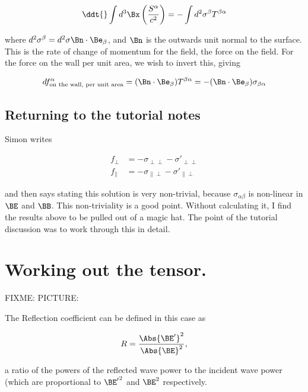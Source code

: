 \begin{equation}\label{eqn:relativisticElectrodynamicsT9:11}
\ddt{} \int d^3 \Bx \left( \frac{S^\alpha}{c^2} \right) = - \int d^2 \sigma^\beta T^{\beta \alpha}
\end{equation}

where $d^2 \sigma^\beta = d^2 \sigma \Bn \cdot \Be_\beta$, and $\Bn$ is the outwards unit normal to the surface.  This is the rate of change of momentum for the field, the force on the field.  For the force on the wall per unit area, we wish to invert this, giving

\begin{equation}\label{eqn:relativisticElectrodynamicsT9:500}
df^\alpha_{\text{on the wall, per unit area}}
= (\Bn \cdot \Be_\beta) T^{\beta \alpha}
= -(\Bn \cdot \Be_\beta) \sigma_{\beta \alpha}
\end{equation}

\subsection{Returning to the tutorial notes}

Simon writes

\begin{align}\label{eqn:relativisticElectrodynamicsT9:30}
f_\perp &= - \sigma_{\perp \perp} - {\sigma'}_{\perp \perp} \\
f_\parallel &= - \sigma_{\parallel \perp} - {\sigma'}_{\parallel \perp} 
\end{align}

and then says stating this solution is very non-trivial, because $\sigma_{\alpha \beta}$ is non-linear in $\BE$ and $\BB$.  This non-triviality is a good point.  Without calculating it, I find the results above to be pulled out of a magic hat.  The point of the tutorial discussion was to work through this in detail.

\section{Working out the tensor.}

FIXME: PICTURE: 

The Reflection coefficient can be defined in this case as

\begin{equation}\label{eqn:relativisticElectrodynamicsT9:50}
R = \frac{ \Abs{\BE'}^2 }{ \Abs{\BE}^2 },
\end{equation}

a ratio of the powers of the reflected wave power to the incident wave power (which are proportional to ${\BE'}^2$ and ${\BE}^2$ respectively.

